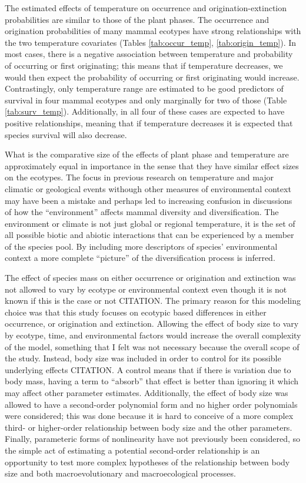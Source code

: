 \documentclass[12pt,letterpaper]{article}
\begin{document}
The estimated effects of temperature on occurrence and origination-extinction probabilities are similar to those of the plant phases. The occurrence and origination probabilities of many mammal ecotypes have strong relationships with the two temperature covariates (Tables \ref{tab:occur_temp}, \ref{tab:origin_temp}). In most cases, there is a negative association between temperature and probability of occurring or first originating; this means that if temperature decreases, we would then expect the probability of occurring or first originating would increase. Contrastingly, only temperature range are estimated to be good predictors of survival in four mammal ecotypes and only marginally for two of those (Table \ref{tab:surv_temp}). Additionally, in all four of these cases are expected to have positive relationships, meaning that if temperature decreases it is expected that species survival will also decrease.



What is the comparative size of the effects of plant phase and temperature are approximately equal in importance in the sense that they have similar effect sizes on the ecotypes. The focus in previous research on temperature and major climatic or geological events withough other measures of environmental context may have been a mistake and perhaps led to increasing confusion in discussions of how the ``environment'' affects mammal diversity and diversification. The environment or climate is not just global or regional temperature, it is the set of all possible biotic and abiotic interactions that can be experienced by a member of the species pool. By including more descriptors of species' environmental context a more complete ``picture'' of the diversification process is inferred.


The effect of species mass on either occurrence or origination and extinction was not allowed to vary by ecotype or environmental context even though it is not known if this is the case or not CITATION. The primary reason for this modeling choice was that this study focuses on ecotypic based differences in either occurrence, or origination and extinction. Allowing the effect of body size to vary by ecotype, time, and environmental factors would increase the overall complexity of the model, something that I felt was not necessary because the overall scope of the study. Instead, body size was included in order to control for its possible underlying effects CITATION. A control means that if there is variation due to body mass, having a term to ``absorb'' that effect is better than ignoring it which may affect other parameter estimates. Additionally, the effect of body size was allowed to have a second-order polynomial form and no higher order polynomials were considered; this was done because it is hard to conceive of a more complex third- or higher-order relationship between body size and the other parameters. Finally, parameteric forms of nonlinearity have not previously been considered, so the simple act of estimating a potential second-order relationship is an opportunity to test more complex hypotheses of the relationship between body size and both macroevolutionary and macroecological processes.
\end{document}
